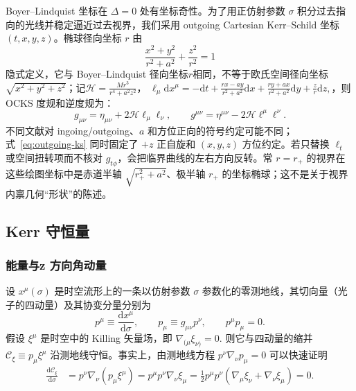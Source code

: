 \documentclass[UTF8,11pt,a4paper,fontset=fandol]{ctexart}
\newcommand{\dd}{\mathrm{d}}
\begin{document}
Boyer--Lindquist 坐标在 \(\Delta=0\) 处有坐标奇性。为了用正仿射参数 \(\sigma\) 积分过去指向的光线并稳定逼近过去视界，我们采用 outgoing Cartesian Kerr--Schild 坐标\((t,x,y,z)\)\cite{Chan2018,Bozzola2023}。椭球径向坐标 \(r\) 由
\begin{equation}
\frac{x^2+y^2}{r^2+a^2}+\frac{z^2}{r^2}=1
\end{equation}
隐式定义，它与 Boyer--Lindquist 径向坐标$r$相同，不等于欧氏空间径向坐标 \(\sqrt{x^2+y^2+z^2}\)；记$\mathcal{H}=\frac{Mr^3}{r^4+a^2z^2}$，
$\bm{\ell}_\mu\dd x^\mu=-\dd t+\frac{rx-ay}{r^2+a^2}\dd x
+\frac{ry+ax}{r^2+a^2}\dd y+\frac{z}{r}\dd z,\nonumber$，则 OCKS 度规和逆度规为：
\begin{equation}
g_{\mu\nu}=\eta_{\mu\nu}+2\mathcal{H}\bm{\ell}_\mu\bm{\ell}_\nu,\qquad
g^{\mu\nu}=\eta^{\mu\nu}-2\mathcal{H}\bm{\ell}^\mu\bm{\ell}^\nu.\label{eq:outgoing-ks}
\end{equation}
不同文献对 ingoing/outgoing、\(a\) 和方位正向的符号约定可能不同；式~\eqref{eq:outgoing-ks} 同时固定了 \(+z\) 正自旋和 \((x,y,z)\) 方位约定。若只替换 \(\ell_t\) 或空间扭转项而不核对 \(g_{t\phi}\)，会把临界曲线的左右方向反转。常 \(r=r_+\) 的视界在这些绘图坐标中是赤道半轴 \(\sqrt{r_+^2+a^2}\)、极半轴 \(r_+\) 的坐标椭球；这不是关于视界内禀几何“形状”的陈述。

\subsection{Kerr 守恒量}

\subsubsection*{能量与z 方向角动量}
设 $x^\mu(\sigma)$ 是时空流形上的一条以仿射参数 $\sigma$ 参数化的零测地线，其切向量（光子的四动量）及其协变分量分别为
\begin{equation}
    p^\mu\equiv\frac{\mathrm d x^\mu}{\mathrm d\sigma},\qquad
    p_\mu\equiv g_{\mu\nu}p^\nu,\qquad
    p^\mu p_\mu=0.
\end{equation}
假设 $\xi^\mu$ 是时空中的 Killing 矢量场，即
$\nabla_{(\mu}\xi_{\nu)}=0.$
则它与四动量的缩并
$\mathcal C_\xi\equiv p_\mu\xi^\mu$
沿测地线守恒。事实上，由测地线方程 $p^\nu\nabla_\nu p_\mu=0$ 可以快速证明
\begin{align}
    \frac{\mathrm d\mathcal C_\xi}{\mathrm d\sigma}
    &=p^\nu\nabla_\nu(p_\mu\xi^\mu)
      =p^\mu p^\nu\nabla_\nu\xi_\mu \nonumber =\frac12p^\mu p^\nu
      \left(\nabla_\mu\xi_\nu+\nabla_\nu\xi_\mu\right)=0.
\end{align}
\end{document}
